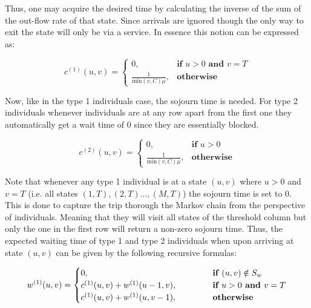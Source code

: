 Thus, one may acquire the desired time by calculating the inverse of the sum of 
the out-flow rate of that state. 
Since arrivals are ignored though the only way to exit the state will only be 
via a service. 
In essence this notion can be expressed as:

\begin{equation} \label{eq:sojourn_type_1}
    c^{(1)}(u,v) = 
    \begin{cases}
        0, & \textbf{if } u > 0 \textbf{ and } v = T \\
        \frac{1}{\text{min}(v,C)\mu}, & \textbf{otherwise}
    \end{cases}
\end{equation}

Now, like in the type 1 individuals case, the sojourn time is needed. 
For type 2 individuals whenever individuals are at any row apart from the 
first one they automatically get a wait time of \(0\) since they are essentially 
blocked.

\begin{equation} \label{eq:sojourn_type_2}
    c^{(2)}(u,v) = 
    \begin{cases}
        0, & \textbf{if } u > 0 \\
        \frac{1}{\text{min}(v,C)\mu}, & \textbf{otherwise}
    \end{cases}
\end{equation}

Note that whenever any type 1 individual is at a state \((u,v)\) where 
\(u > 0\) 
and \(v = T\) (i.e. all states \((1,T), (2,T) \dots, (M,T)\)) the sojourn time is 
set to \(0\). 
This is done to capture the trip thorough the Markov chain from the perspective 
of individuals. 
Meaning that they will visit all states of the threshold column but only the one 
in the first row will return a non-zero sojourn time.
Thus, the expected waiting time of type 1 and type 2 individuals when upon
arriving at state \( (u,v) \) can be given by the following recursive formulas:

\begin{equation} \label{eq:waiting-time-at-each-state-type-1}
    w^{(1)}(u,v) = 
    \begin{cases} 
        0, \hspace{4.85cm} & \textbf{if } (u,v) \notin S_w \\
        c^{(1)}(u,v) + w^{(1)}(u-1, v), & \textbf{if } u > 0 \textbf{ and } v = T \\
        c^{(1)}(u,v) + w^{(1)}(u, v-1), & \textbf{otherwise}
    \end{cases}
\end{equation}

